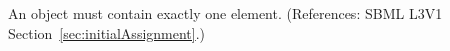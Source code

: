 An \InitialAssignment object must contain exactly one  element.
(References: SBML L3V1 Section~\ref{sec:initialAssignment}.)
